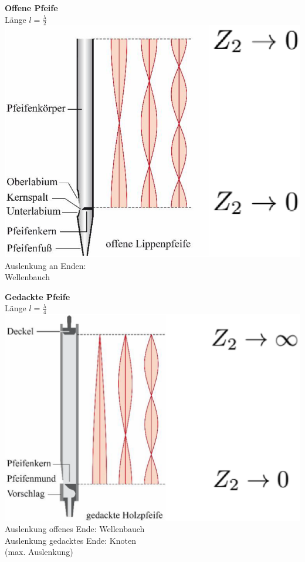 \begin{minipage}{0.48\linewidth}
	\textbf{Offene Pfeife}\\
	Länge $l = \frac{\lambda}{2}$ \\

	\includegraphics[width=0.8\linewidth]{Bilder/Wellen-Optik/offene_pfeiffe}\\

	Auslenkung an Enden: \\
	Wellenbauch \\
\end{minipage}
\hfill
\begin{minipage}{0.48\linewidth}
	\textbf{Gedackte Pfeife} \\
	Länge $l = \frac{\lambda}{4}$ \\

	\includegraphics[width=0.85\linewidth]{Bilder/Wellen-Optik/gedackte_pfeiffe} \\

	Auslenkung offenes Ende: Wellenbauch \\
	Auslenkung gedacktes Ende: Knoten \\
	(max. Auslenkung) \\
\end{minipage}

